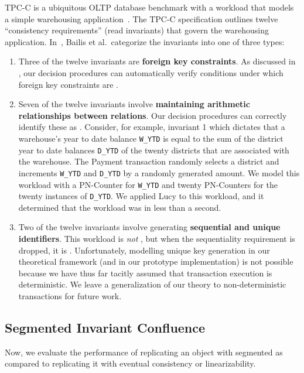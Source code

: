 \example[TPC-C]
TPC-C is a ubiquitous OLTP database benchmark with a workload that models a
simple warehousing application~\cite{difallah2013oltp}. The TPC-C specification
outlines twelve ``consistency requirements'' (read invariants) that govern the
warehousing application. In~\cite{bailis2014coordination}, Bailis et al.\
categorize the invariants into one of three types:
\begin{enumerate}
  \item
    Three of the twelve invariants are \textbf{foreign key constraints}.  As
    discussed in \exampleref{ForeignKeysEval}, our decision procedures can
    automatically verify conditions under which foreign key constraints are
    \invariantconfluent{}.

  \item
    \newcommand{\ttt}[1]{{\smaller \texttt{#1}}} Seven of the twelve invariants
    involve \textbf{maintaining arithmetic relationships between relations}.
    Our decision procedures can correctly identify these as
    \invariantconfluent{}. Consider, for example, invariant 1 which dictates
    that a warehouse's year to date balance \ttt{W\_YTD} is equal to the sum of
    the district year to date balances \ttt{D\_YTD} of the twenty districts
    that are associated with the warehouse. The Payment transaction randomly
    selects a district and increments \ttt{W\_YTD} and \ttt{D\_YTD} by a
    randomly generated amount. We model this workload with a PN-Counter for
    \ttt{W\_YTD} and twenty PN-Counters for the twenty instances of
    \ttt{D\_YTD}. We applied Lucy to this workload, and it determined that the
    workload was \invariantconfluent{} in less than a second.

  \item
    Two of the twelve invariants involve generating \textbf{sequential and
    unique identifiers}. This workload is \emph{not} \invariantconfluent{}, but
    when the sequentiality requirement is dropped, it is \invariantconfluent{}.
    Unfortunately, modelling unique key generation in our theoretical framework
    (and in our prototype implementation) is not possible because we have thus
    far tacitly assumed that transaction execution is deterministic. We leave a
    generalization of our theory to non-deterministic transactions for future
    work.
\end{enumerate}

\subsection{Segmented Invariant Confluence}%
Now, we evaluate the performance of replicating an object with segmented
\invariantconfluence{} as compared to replicating it with eventual consistency
or linearizability.


